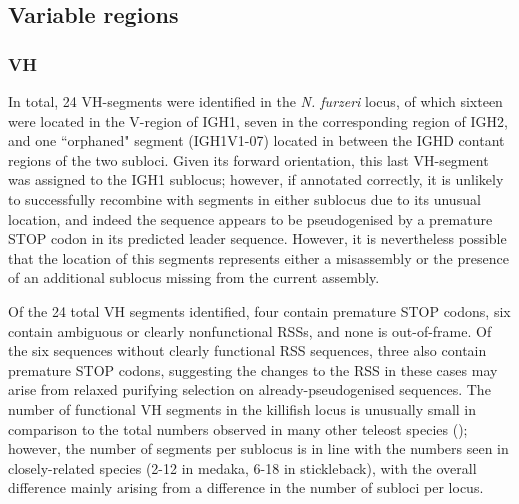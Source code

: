 	\subsection{Variable regions}
		\label{sec:nfu-variable}

	
	\subsubsection{VH}
	
	In total, 24 VH-segments were identified in the \textit{N. furzeri} locus, of which sixteen were located in the V-region of IGH1, seven in the corresponding region of IGH2, and one ``orphaned" segment (IGH1V1-07) located in between the IGHD contant regions of the two subloci. Given its forward orientation, this last VH-segment was assigned to the IGH1 sublocus; however, if annotated correctly, it is unlikely to successfully recombine with segments in either sublocus due to its unusual location, and indeed the sequence appears to be pseudogenised by a premature STOP codon in its predicted leader sequence. However, it is nevertheless possible that the location of this segments represents either a misassembly or the presence of an additional sublocus missing from the current assembly.
		
	Of the 24 total VH segments identified, four contain premature STOP codons, six contain ambiguous or clearly nonfunctional RSSs, and none is out-of-frame. Of the six sequences without clearly functional RSS sequences, three also contain premature STOP codons, suggesting the changes to the RSS in these cases may arise from relaxed purifying selection on already-pseudogenised sequences. The number of functional VH segments in the killifish locus is unusually small in comparison to the total numbers observed in many other teleost species (); however, the number of segments per sublocus is in line with the numbers seen in closely-related species (2-12 in medaka, 6-18 in stickleback), with the overall difference mainly arising from a difference in the number of subloci per locus.
	
